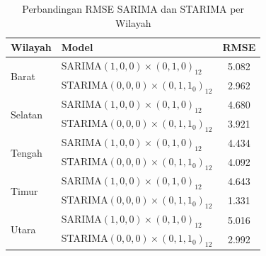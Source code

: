 \begin{table}[H]
    \centering
    \scriptsize
    \caption{Perbandingan RMSE SARIMA dan STARIMA per Wilayah}
    \label{table:perbandingan-rmse-arima-starima}
    \renewcommand{\arraystretch}{1.25}

    \begin{tabular}{l l c}
        \toprule
        \textbf{Wilayah} & \textbf{Model} & \textbf{RMSE} \\
        \midrule

        \multirow{2}{*}{Barat}
            & SARIMA$(1,0,0) \times (0,1,0)_{12}$    & 5.082 \\
            & STARIMA$(0,0,0) \times (0,1,1_{0})_{12}$        & 2.962 \\
        \midrule

        \multirow{2}{*}{Selatan}
            & SARIMA$(1,0,0) \times (0,1,0)_{12}$    & 4.680 \\
            & STARIMA$(0,0,0) \times (0,1,1_{0})_{12}$   & 3.921 \\
        \midrule

        \multirow{2}{*}{Tengah}
            & SARIMA$(1,0,0) \times (0,1,0)_{12}$    & 4.434 \\
            & STARIMA$(0,0,0) \times (0,1,1_0)_{12}$        & 4.092 \\
        \midrule

        \multirow{2}{*}{Timur}
            & SARIMA$(1,0,0) \times (0,1,0)_{12}$    & 4.643 \\
            & STARIMA$(0,0,0) \times (0,1,1_0)_{12}$        & 1.331 \\
        \midrule

        \multirow{2}{*}{Utara}
            & SARIMA$(1,0,0) \times (0,1,0)_{12}$    & 5.016 \\
            & STARIMA$(0,0,0) \times (0,1,1_0)_{12}$        & 2.992 \\
        \bottomrule
    \end{tabular}
\end{table}
